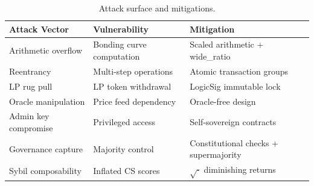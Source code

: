 \begin{table}[H]
\centering
\caption{Attack surface and mitigations.}
\label{tab:attack-summary}
\begin{tabular}{@{}p{3.5cm}p{4cm}p{4.5cm}@{}}
\toprule
\textbf{Attack Vector} & \textbf{Vulnerability} & \textbf{Mitigation} \\
\midrule
Arithmetic overflow & Bonding curve computation & Scaled arithmetic + wide\_ratio \\
Reentrancy & Multi-step operations & Atomic transaction groups \\
LP rug pull & LP token withdrawal & LogicSig immutable lock \\
Oracle manipulation & Price feed dependency & Oracle-free design \\
Admin key compromise & Privileged access & Self-sovereign contracts \\
Governance capture & Majority control & Constitutional checks + supermajority \\
Sybil composability & Inflated CS scores & $\sqrt{\cdot}$ diminishing returns \\
\bottomrule
\end{tabular}
\end{table}
